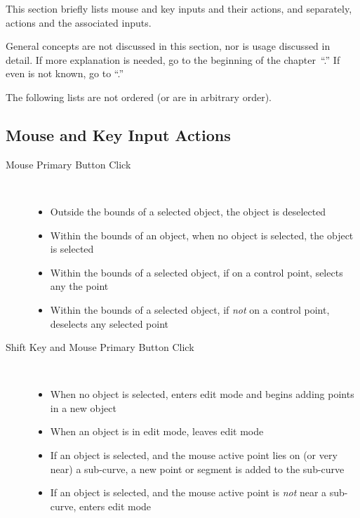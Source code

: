 	This section briefly lists mouse and key
	inputs and their actions, and
	separately, actions and the associated inputs.

	General concepts are not discussed in this section,
	nor is usage discussed in detail. If more explanation
	is needed, go to the beginning of the
	chapter~``.''
	If even \IXpov{} is not known, go to
	``.''
	
	The following lists are not ordered (or are in
	arbitrary order).
	
		\subsection{Mouse and Key Input Actions}%
		\label{ssec:input_to_action}

		\begin{description}
		  \item[Mouse Primary Button Click] \hfill \\
		    \begin{itemize}
		      \item Outside the bounds of a selected object, the
		        object is deselected
		      \item Within the bounds of an object, when no object
		        is selected, the object is selected
		      \item Within the bounds of a selected object,
		        if on a control point, selects any the point
		      \item Within the bounds of a selected object,
		        if \emph{not} on a control point,
		        deselects any selected point
		    \end{itemize}
		  \item[Shift Key and Mouse Primary Button Click] \hfill \\
		    \begin{itemize}
		      \item When no
		        object is selected, enters edit mode and
		        begins adding points in a
		        new object
		      \item When an
		        object is in edit mode,
		        leaves edit mode
		      \item If an object is selected, and the mouse active
		        point lies on (or very near) a sub-curve, a
		        new point or segment is added to the sub-curve
		      \item If an object is selected, and the mouse active
		        point is \emph{not} near a sub-curve, enters edit mode

\end{itemize}
\end{description}
